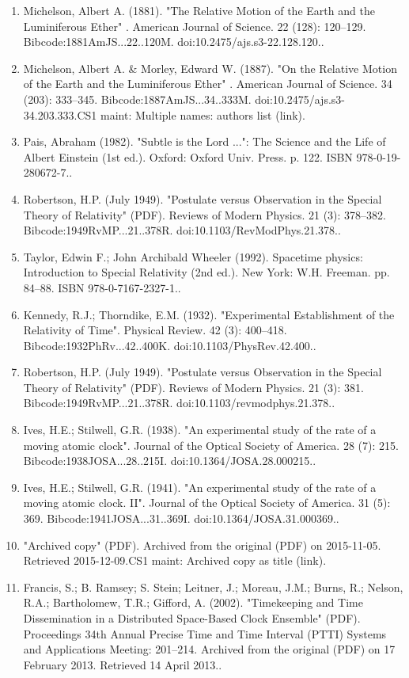 \begin{enumerate}
\item Michelson, Albert A. (1881). "The Relative Motion of the Earth and the Luminiferous Ether" . American Journal of Science. 22 (128): 120–129. Bibcode:1881AmJS...22..120M. doi:10.2475/ajs.s3-22.128.120..
\item Michelson, Albert A. & Morley, Edward W. (1887). "On the Relative Motion of the Earth and the Luminiferous Ether" . American Journal of Science. 34 (203): 333–345. Bibcode:1887AmJS...34..333M. doi:10.2475/ajs.s3-34.203.333.CS1 maint: Multiple names: authors list (link).
\item Pais, Abraham (1982). "Subtle is the Lord ...": The Science and the Life of Albert Einstein (1st ed.). Oxford: Oxford Univ. Press. p. 122. ISBN 978-0-19-280672-7..
\item Robertson, H.P. (July 1949). "Postulate versus Observation in the Special Theory of Relativity" (PDF). Reviews of Modern Physics. 21 (3): 378–382. Bibcode:1949RvMP...21..378R. doi:10.1103/RevModPhys.21.378..
\item Taylor, Edwin F.; John Archibald Wheeler (1992). Spacetime physics: Introduction to Special Relativity (2nd ed.). New York: W.H. Freeman. pp. 84–88. ISBN 978-0-7167-2327-1..
\item Kennedy, R.J.; Thorndike, E.M. (1932). "Experimental Establishment of the Relativity of Time". Physical Review. 42 (3): 400–418. Bibcode:1932PhRv...42..400K. doi:10.1103/PhysRev.42.400..
\item Robertson, H.P. (July 1949). "Postulate versus Observation in the Special Theory of Relativity" (PDF). Reviews of Modern Physics. 21 (3): 381. Bibcode:1949RvMP...21..378R. doi:10.1103/revmodphys.21.378..
\item Ives, H.E.; Stilwell, G.R. (1938). "An experimental study of the rate of a moving atomic clock". Journal of the Optical Society of America. 28 (7): 215. Bibcode:1938JOSA...28..215I. doi:10.1364/JOSA.28.000215..
\item Ives, H.E.; Stilwell, G.R. (1941). "An experimental study of the rate of a moving atomic clock. II". Journal of the Optical Society of America. 31 (5): 369. Bibcode:1941JOSA...31..369I. doi:10.1364/JOSA.31.000369..
\item "Archived copy" (PDF). Archived from the original (PDF) on 2015-11-05. Retrieved 2015-12-09.CS1 maint: Archived copy as title (link).
\item Francis, S.; B. Ramsey; S. Stein; Leitner, J.; Moreau, J.M.; Burns, R.; Nelson, R.A.; Bartholomew, T.R.; Gifford, A. (2002). "Timekeeping and Time Dissemination in a Distributed Space-Based Clock Ensemble" (PDF). Proceedings 34th Annual Precise Time and Time Interval (PTTI) Systems and Applications Meeting: 201–214. Archived from the original (PDF) on 17 February 2013. Retrieved 14 April 2013..
\end{enumerate}
